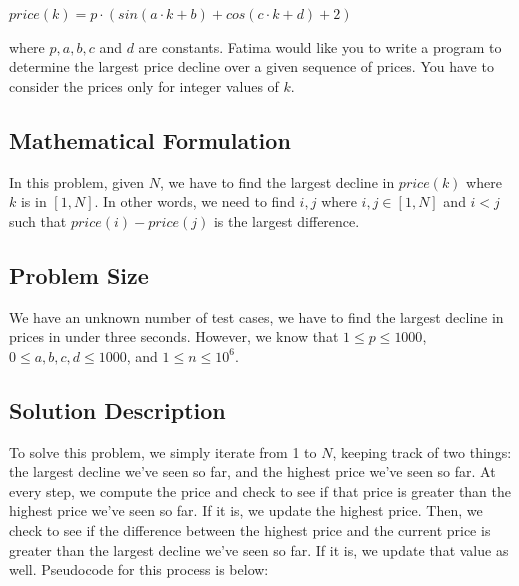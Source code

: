 \documentclass[12pt]{article}
\begin{document}
\begin{center}
    $price(k) = p · (sin(a · k + b) + cos(c · k + d) + 2)$
\end{center}

\noindent where $p, a, b, c$ and $d$ are constants. Fatima would like you to
write a program to determine the largest price decline over a given
sequence of prices. You have to consider the prices only for integer
values of $k$.

\subsection{Mathematical Formulation}

In this problem, given $N$, we have to find the largest decline
in $price(k)$ where $k$ is in $[1, N]$. In other words, we need
to find $i, j$ where $i, j \in [1, N]$ and $i < j$ such that
$price(i) - price(j)$ is the largest difference.

\subsection{Problem Size}

We have an unknown number of test cases, we have to find the largest
decline in prices in under three seconds. However, we know that  $1
\leq p \leq 1000$, $0 \leq a, b, c, d \leq 1000$, and $1 \leq n \leq 10^6$.

\subsection{Solution Description}

To solve this problem, we simply iterate from 1 to $N$, keeping
track of two things: the largest decline we've seen so far, and
the highest price we've seen so far. At every step, we compute
the price and check to see if that price is greater than the
highest price we've seen so far. If it is, we update the highest
price. Then, we check to see if the difference between the
highest price and the current price is greater than the largest
decline we've seen so far. If it is, we update that value as well.
Pseudocode for this process is below:
\end{document}
